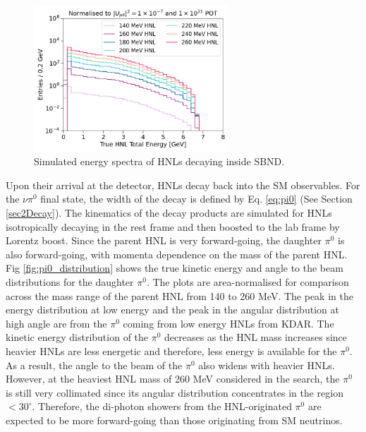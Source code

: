 \begin{figure}[hb!] 
\centering    
\includegraphics[width=0.65\textwidth]{HNL_Energy_Spectrum}
\caption[Simulated Energy Spectra of HNLs Decaying Inside SBND]{
Simulated energy spectra of HNLs decaying inside SBND.
}
\label{fig:HNL_Energy_Spectrum}
\end{figure}

Upon their arrival at the detector, HNLs decay back into the SM observables.
For the $\nu\pi^{0}$ final state, the width of the decay is defined by Eq. \ref{eq:pi0} (See Section \ref{sec2Decay}).
The kinematics of the decay products are simulated for HNLs isotropically decaying in the rest frame and then boosted to the lab frame by Lorentz boost.
Since the parent HNL is very forward-going, the daughter $\pi^0$ is also forward-going, with momenta dependence on the mass of the parent HNL. 
Fig \ref{fig:pi0_distribution} shows the true kinetic energy and angle to the beam distributions for the daughter $\pi^0$.
The plots are area-normalised for comparison across the mass range of the parent HNL from 140 to 260 MeV. 
The peak in the energy distribution at low energy and the peak in the angular distribution at high angle are from the $\pi^0$ coming from low energy HNLs from KDAR.
The kinetic energy distribution of the $\pi^0$ decreases as the HNL mass increases since heavier HNLs are less energetic and therefore, less energy is available for the $\pi^0$.
As a result, the angle to the beam of the $\pi^0$ also widens with heavier HNLs.
However, at the heaviest HNL mass of 260 MeV considered in the search, the $\pi^0$ is still very collimated since its angular distribution concentrates in the region $< 30^\circ$. 
Therefore, the di-photon showers from the HNL-originated $\pi^0$ are expected to be more forward-going than those originating from SM neutrinos.

